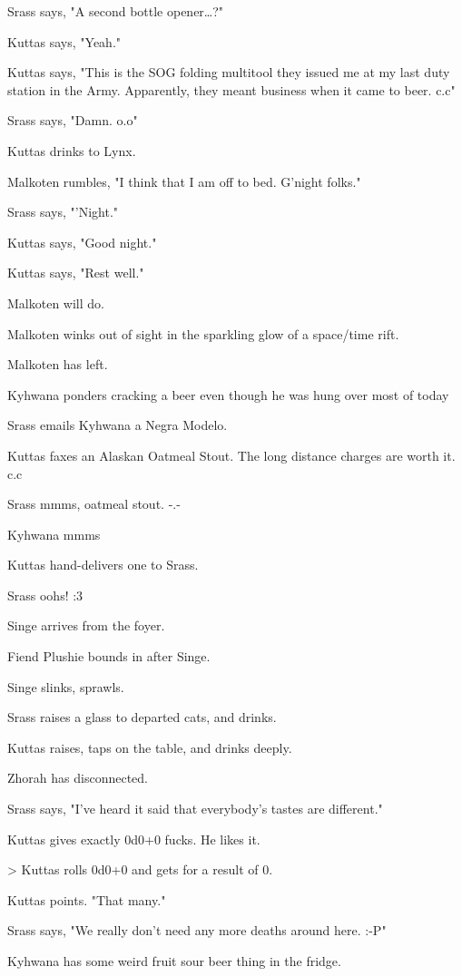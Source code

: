 Srass says, "A second bottle opener\ldots{}?"

Kuttas says, "Yeah."

Kuttas says, "This is the SOG folding multitool they issued me at my last duty station in the Army. Apparently, they meant business when it came to beer. c.c"

Srass says, "Damn. o.o"

Kuttas drinks to Lynx.

Malkoten rumbles, "I think that I am off to bed.  G'night folks."

Srass says, "'Night."

Kuttas says, "Good night."

Kuttas says, "Rest well."

Malkoten will do.

Malkoten winks out of sight in the sparkling glow of a space/time rift.

Malkoten has left.

Kyhwana ponders cracking a beer even though he was hung over most of today

Srass emails Kyhwana a Negra Modelo.

Kuttas faxes an Alaskan Oatmeal Stout. The long distance charges are worth it. c.c

Srass mmms, oatmeal stout. -.-

Kyhwana mmms

Kuttas hand-delivers one to Srass.

Srass oohs! :3

Singe arrives from the foyer.

Fiend Plushie bounds in after Singe.

Singe slinks, sprawls.

Srass raises a glass to departed cats, and drinks.

Kuttas raises, taps on the table, and drinks deeply.

Zhorah has disconnected.

Srass says, "I've heard it said that everybody's tastes are different."

Kuttas gives exactly 0d0+0 fucks. He likes it.

> Kuttas rolls 0d0+0 and gets for a result of 0.

Kuttas points. "That many."

Srass says, "We really don't need any more deaths around here. :-P"

Kyhwana has some weird fruit sour beer thing in the fridge.

